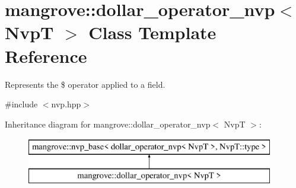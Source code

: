 \hypertarget{classmangrove_1_1dollar__operator__nvp}{}\section{mangrove\+:\+:dollar\+\_\+operator\+\_\+nvp$<$ NvpT $>$ Class Template Reference}
\label{classmangrove_1_1dollar__operator__nvp}


Represents the \$ operator applied to a field.  




{\ttfamily \#include $<$nvp.\+hpp$>$}

Inheritance diagram for mangrove\+:\+:dollar\+\_\+operator\+\_\+nvp$<$ NvpT $>$\+:\begin{figure}[H]
\begin{center}
\leavevmode
\includegraphics[height=2.000000cm]{classmangrove_1_1dollar__operator__nvp}
\end{center}
\end{figure}
